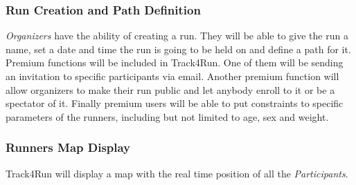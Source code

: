 \documentclass[../../rasd.tex]{subfiles}
\begin{document}
				\subsubsection{Run Creation and Path Definition}
				\textit{Organizers} have the ability of creating a run. They will be able to give the run a name, set a date and time the run is going to be held on and define a path for it. Premium functions will be included in Track4Run. One of them will be sending an invitation to specific participants via email. Another premium function will allow organizers to make their run public and let anybody enroll to it or be a spectator of it. Finally premium users will be able to put constraints to specific parameters of the runners, including but not limited to age, sex and weight.
				
				\subsubsection{Runners Map Display}

				Track4Run will display a map with the real time position of all the \textit{Participants}. 
\end{document}
